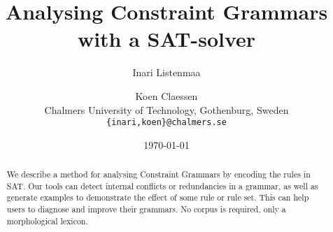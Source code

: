 \documentclass[11pt]{article}
\title{Analysing Constraint Grammars with a SAT-solver}
\author{Inari Listenmaa \and Koen Claessen \\
 Chalmers University of Technology, Gothenburg, Sweden \\
 {\tt \{inari,koen\}@chalmers.se} }
\date{\today}
\begin{document}
\maketitle

\begin{abstract}
We describe a method for
 analysing Constraint Grammars by encoding the
rules in SAT.
Our tools can detect internal conflicts or redundancies in a grammar,
as well as generate examples to demonstrate the effect of some rule or
rule set.
This can help users to diagnose and improve their grammars.
No corpus is required, only a morphological lexicon.
\end{abstract}











\end{document}
